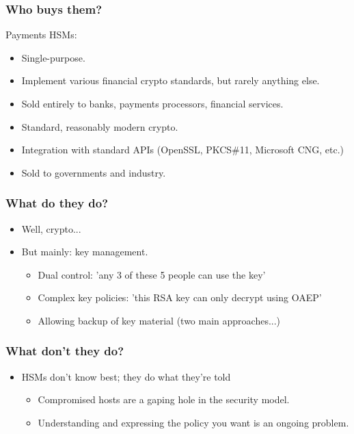 \documentclass{beamer}
\begin{document}
\frame
{
  \frametitle{Who buys them?}

  Payments HSMs:
  
  \begin{itemize}
    \item<1-> Single-purpose.
    \item<2-> Implement various financial crypto standards, but rarely anything else.
    \item<3-> Sold entirely to banks, payments processors, financial services.
  \end{itemize}


  \begin{itemize}
    \item<4-> Standard, reasonably modern crypto.
    \item<5-> Integration with standard APIs (OpenSSL, PKCS\#11, Microsoft CNG, etc.)
    \item<6-> Sold to governments and industry.
  \end{itemize}
}

\frame
{
  \frametitle{What do they do?}

  \begin{itemize}
    \item<1-> Well, crypto...
    \item<2-> But mainly: key management.  
      \begin{itemize}
        \item<3-> Dual control: 'any 3 of these 5 people can use the key'
        \item<4-> Complex key policies: 'this RSA key can only decrypt using OAEP'
        \item<5-> Allowing backup of key material (two main approaches...)
      \end{itemize}
  \end{itemize}
}

\frame
{
  \frametitle{What don't they do?}

  \begin{itemize}
    \item<1-> HSMs don't know best; they do what they're told
    \begin{itemize}
      \item<2-> Compromised hosts are a gaping hole in the security model.
                

      \item<4-> Understanding and expressing the policy you want is an ongoing problem.
    \end{itemize}
  \end{itemize}
}
\end{document}
